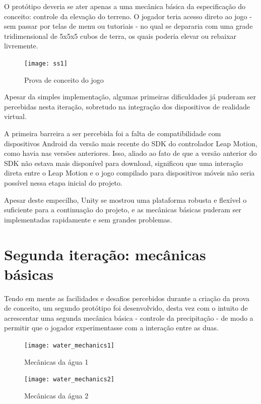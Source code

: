 O protótipo deveria se ater apenas a uma mecânica básica da especificação do conceito: controle da elevação do terreno. O jogador teria acesso direto ao jogo - sem passar por telas de menu ou tutoriais - no qual se depararia com uma grade tridimensional de 5x5x5 cubos de terra, os quais poderia elevar ou rebaixar livremente.

\begin{figure}[h]
	\centering
	\texttt{[image: ss1]}
	\caption{Prova de conceito do jogo}
\end{figure}

Apesar da simples implementação, algumas  primeiras dificuldades já puderam ser percebidas nesta iteração, sobretudo na integração dos dispositivos de realidade virtual.

A primeira barreira a ser percebida foi a falta de compatibilidade com dispositivos Android da versão mais recente do SDK do controlador Leap Motion, como havia nas versões anteriores. Isso, aliado ao fato de que a versão anterior do SDK não estava mais disponível para download, significou que uma interação direta entre o Leap Motion e o jogo compilado para dispositivos móveis não seria possível nessa etapa inicial do projeto.

Apesar deste empecilho, Unity se mostrou uma plataforma robusta e flexível o suficiente para a continuação do projeto, e as mecânicas básicas puderam ser implementadas rapidamente e sem grandes problemas.

\section{Segunda iteração: mecânicas básicas}\label{sec-segunda-iteracao-mecanicas-basicas}

Tendo em mente as facilidades e desafios percebidos durante a criação da prova de conceito, um segundo protótipo foi desenvolvido, desta vez com o intuito de acrescentar uma segunda mecânica básica - controle da precipitação - de modo a permitir que o jogador experimentasse com a interação entre as duas.

\begin{figure}[h]
	\centering
	\texttt{[image: water\_mechanics1]}
	\caption{Mecânicas da água 1}
\end{figure}

\begin{figure}[h]
	\centering
	\texttt{[image: water\_mechanics2]}
	\caption{Mecânicas da água 2}
\end{figure}


